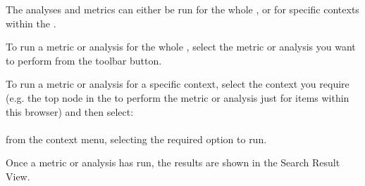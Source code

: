 The analyses and metrics can either be run for the whole \gdproject{}, or for specific contexts within the \gdproject{}. 

To run a metric or analysis for the whole \gdproject{}, select the metric or analysis you want to perform from the toolbar button. 

To run a metric or analysis for a specific context, select the context you require (e.g. the top node in the \gdtestcasebrowser{} to perform the metric or analysis just for items within this browser) and then select:\\
\\
from the context menu, selecting the required option to run. 

Once a metric or analysis has run, the results are shown in the Search Result View. 
